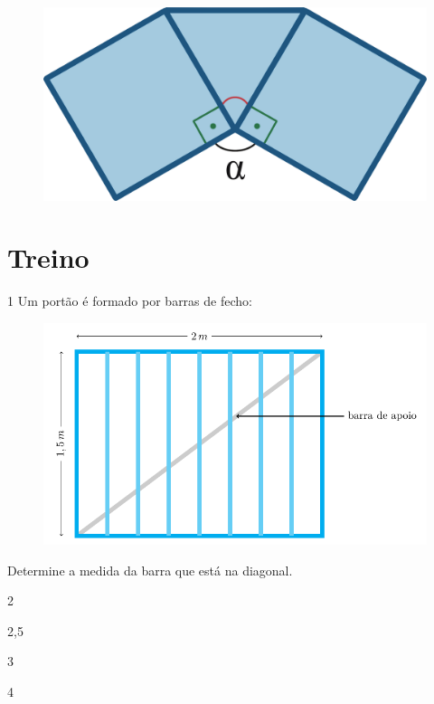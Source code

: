 \begin{figure}[htpb!]
\centering
\includegraphics[width=.5\textwidth]{./ilustras-mat/modulo_11-atividade_10_resposta.png}
\end{figure}

\begin{emptybox}
\end{emptybox}

\pagebreak
\section*{Treino}

\num{1} Um portão é formado por barras de fecho:

\begin{figure}[htpb!]
\centering
\includegraphics[width=\textwidth]{./tikz/026.pdf}
\end{figure}

Determine a medida da barra que está na diagonal.

\begin{multicols}{2}
\begin{escolha}
  \item 2

  \item 2,5
  
  \item 3
  
  \item 4
\end{escolha}
\end{multicols}


